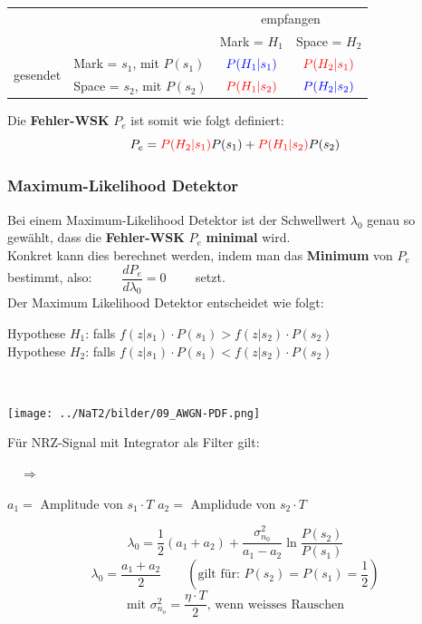 \begin{minipage}[c]{10cm}
	\begin{center}
	 	\begin{tabular}{l l|c|c|}
	 		\cline{3-4} 
	 			& & \multicolumn{2}{c|}{empfangen} \\
			\cline{3-4}
				& & Mark = $H_1$ & Space = $H_2$ \\
			\hline
				 \multicolumn{1}{|l|}{\multirow{2}{*}{  gesendet }} 
				 & Mark = $s_1$, mit $P(s_1)$ & $\textcolor{blue}{P(H_1 | s_1)}$ 
				 &  $\textcolor{red}{P(H_2 | s_1)}$\\
			\cline{2-4}
				\multicolumn{1}{|l|}{} & Space = $s_2$, mit $P(s_2)$ & $\textcolor{red}{P(H_1 | s_2)}$ 
				& $\textcolor{blue}{P(H_2 | s_2)}$ \\
			\hline
		\end{tabular}  
  	\end{center}
\end{minipage}
\begin{minipage}[c]{8cm}
	Die \textbf{Fehler-WSK} $P_e$ ist somit wie folgt definiert:
	$$ P_e = \textcolor{red}{P(H_2 | s_1)} P(s_1) + \textcolor{red}{P(H_1 | s_2)}
	P(s_2)$$
\end{minipage} 

\subsubsection{Maximum-Likelihood Detektor}
Bei einem Maximum-Likelihood Detektor ist der Schwellwert $\lambda_0$ genau so gewählt, dass die
\textbf{Fehler-WSK} $P_e$ \textbf{minimal} wird. \\
Konkret kann dies berechnet werden, indem man das \textbf{Minimum} von $P_e$ bestimmt, also: $\qquad
\dfrac{d P_e}{d \lambda_0} = 0 \qquad$ setzt. \\ 
Der Maximum Likelihood Detektor entscheidet wie folgt: \qquad \parbox[c]{9cm}{Hypothese $H_1$: \quad falls $f(z|s_1)\cdot P(s_1) > f(z|s_2)\cdot P(s_2)$\\
Hypothese $H_2$: \quad falls $f(z|s_1)\cdot P(s_1) < f(z|s_2)\cdot P(s_2)$}\\

\begin{minipage}[c]{9.5cm}
 	\texttt{[image: ../NaT2/bilder/09\_AWGN-PDF.png]} \newline
	 \begin{minipage}{3.5cm}
	 	 	Für NRZ-Signal mit Integrator als Filter gilt:
	 \end{minipage}
	 	$\quad \Rightarrow \quad$
	 \begin{minipage}{5cm}
	 	$a_1 = $ Amplitude von $s_1 \cdot T$ \newline
	 	$a_2 = $ Amplidude von $s_2 \cdot T$
	 \end{minipage}
\end{minipage}
\begin{minipage}[c]{7cm}
	 $$ \lambda_0 = \dfrac{1}{2} (a_1 + a_2) + \dfrac{\sigma_{n_0}^2}{a_1 - a_2}
 \ln\dfrac{P(s_2)}{P(s_1)} $$ 
 	$$ \lambda_0 = \dfrac{a_1 + a_2}{2} \qquad (\text{gilt für: } P(s_2) = P(s_1) = \dfrac{1}{2})
 	$$
 	$$ \text{mit } \sigma_{n_o}^2 = \frac{\eta \cdot T}{2}\text{, wenn weisses Rauschen}$$
\end{minipage} 

